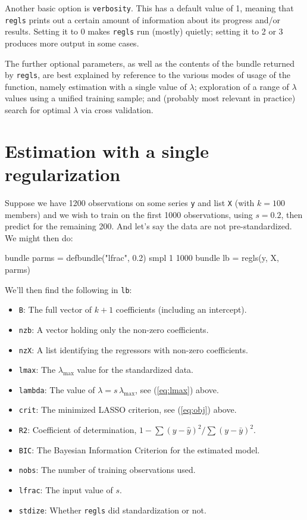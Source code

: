 \documentclass{article}
\begin{document}
Another basic option is \texttt{verbosity}. This has a default value
of 1, meaning that \texttt{regls} prints out a certain amount of
information about its progress and/or results. Setting it to 0 makes
\texttt{regls} run (mostly) quietly; setting it to 2 or 3 produces
more output in some cases.

The further optional parameters, as well as the contents of the bundle
returned by \texttt{regls}, are best explained by reference to the
various modes of usage of the function, namely estimation with a
single value of $\lambda$; exploration of a range of $\lambda$ values
using a unified training sample; and (probably most relevant in
practice) search for optimal $\lambda$ via cross validation.

\section{Estimation with a single regularization}
\label{sec:single-lambda}

Suppose we have 1200 observations on some series \texttt{y} and list
\texttt{X} (with $k=100$ members) and we wish to train on the first
1000 observations, using $s = 0.2$, then predict for the remaining
200. And let's say the data are not pre-standardized. We might then
do:
\begin{code}
bundle parms = defbundle("lfrac", 0.2)
smpl 1 1000
bundle lb = regls(y, X, parms)
\end{code}
We'll then find the following in \texttt{lb}:
\begin{itemize}
\item \texttt{B}: The full vector of $k+1$ coefficients (including an
  intercept).
\item \texttt{nzb}: A vector holding only the non-zero coefficients.
\item \texttt{nzX}: A list identifying the regressors with non-zero
  coefficients.
\item \texttt{lmax}: The $\lambda_{\max}$ value for the standardized
  data.
\item \texttt{lambda}: The value of $\lambda = s\,\lambda_{\max}$, see
  (\ref{eq:lmax}) above.
\item \texttt{crit}: The minimized LASSO criterion, see (\ref{eq:obj})
  above.
\item \texttt{R2}: Coefficient of determination,
  $1 - \sum(y-\hat{y})^2/\sum(y-\bar{y})^2$.
\item \texttt{BIC}: The Bayesian Information Criterion for the
  estimated model.
\item \texttt{nobs}: The number of training observations used.
\item \texttt{lfrac}: The input value of $s$.
\item \texttt{stdize}: Whether \texttt{regls} did standardization or
  not.
\end{itemize}
\end{document}

